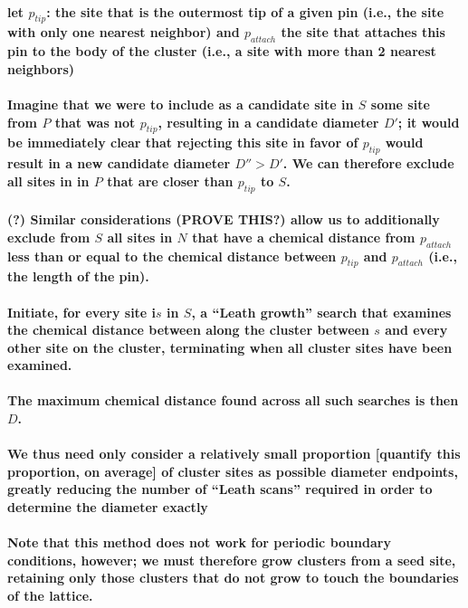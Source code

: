 \documentclass[pre,preprint]{revtex4-1}
\begin{document}
\paragraph{let $p_{tip}$: the site that is the outermost tip of a given pin (i.e., the site with only one nearest neighbor) and $p_{attach}$ the site that attaches this pin to the body of the cluster (i.e., a site with more than 2 nearest neighbors)}
\label{sec-2.4.5.2}
\paragraph{Imagine that we were to include as a candidate site in $S$ some site from $P$ that was not $p_{tip}$, resulting in a candidate diameter $D'$; it would be immediately clear that rejecting this site in favor of $p_{tip}$ would result in a new candidate diameter $D''>D'$.  We can therefore exclude all sites in in $P$ that are closer than $p_{tip}$ to $S$.}
\label{sec-2.4.5.3}
\paragraph{(?) Similar considerations (PROVE THIS?) allow us to additionally exclude from $S$ all sites in $N$ that have a chemical distance from $p_{attach}$ less than or equal to the chemical distance between $p_{tip}$ and $p_{attach}$ (i.e., the length of the pin).}
\label{sec-2.4.5.4}
\paragraph{Initiate, for every site i$s$ in $S$, a ``Leath growth'' search that examines the chemical distance between along the cluster between $s$ and every other site on the cluster, terminating when all cluster sites have been examined.}
\label{sec-2.4.5.5}
\paragraph{The maximum chemical distance found across all such searches is then $D$.}
\label{sec-2.4.5.6}
\paragraph{We thus need only consider a relatively small proportion [quantify this proportion, on average] of cluster sites as possible diameter endpoints, greatly reducing the number of ``Leath scans'' required in order to determine the diameter exactly}
\label{sec-2.4.5.7}
\paragraph{Note that this method does not work for periodic boundary conditions, however; we must therefore grow clusters from a seed site, retaining only those clusters that do not grow to touch the boundaries of the lattice.}
\label{sec-2.4.5.8}
\end{document}
